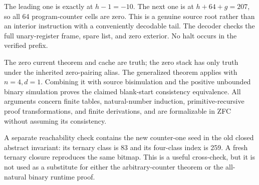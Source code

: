 The leading one is exactly at $h-1=-10$. The next one is at $h+64+g=207$, so all 64 program-counter cells are zero. This is a genuine source root rather than an interior instruction with a conveniently decodable tail. The decoder checks the full unary-register frame, spare list, and zero exterior. No halt occurs in the verified prefix.

The zero current theorem and cache are truth; the zero stack has only truth under the inherited zero-pairing alias. The generalized theorem applies with $n=4,d=1$. Combining it with source bisimulation and the positive unbounded binary simulation proves the claimed blank-start consistency equivalence. All arguments concern finite tables, natural-number induction, primitive-recursive proof transformations, and finite derivations, and are formalizable in ZFC without assuming its consistency.

A separate reachability check contains the new counter-one seed in the old closed abstract invariant: its ternary class is 83 and its four-class index is 259. A fresh ternary closure reproduces the same bitmap. This is a useful cross-check, but it is not used as a substitute for either the arbitrary-counter theorem or the all-natural binary runtime proof.
